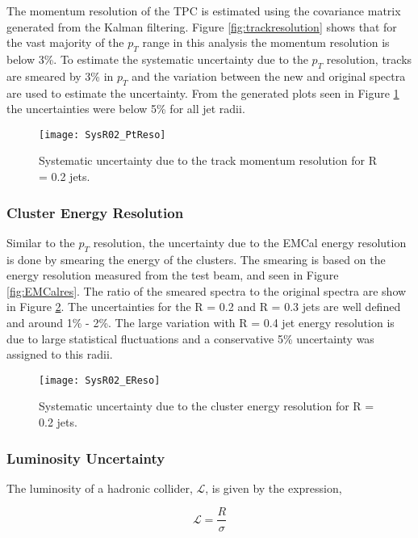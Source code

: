 The momentum resolution of the TPC is estimated using the covariance matrix generated from the Kalman filtering\cite{Fruhwirth:1987fm}.  Figure \ref{fig:trackresolution} shows that for the vast majority of the $p_{T}$ range in this analysis the  momentum resolution is below 3\%.  To estimate the systematic uncertainty due to the $p_{T}$ resolution, tracks are smeared by 3\% in $p_{T}$ and the variation between the new and original spectra are used to estimate the uncertainty.  From the generated plots seen in Figure \ref{fig:pTeff} the uncertainties were below 5\% for all jet radii.

\begin{figure}[b!]
\texttt{[image: SysR02\_PtReso]}
\centering
\caption{Systematic uncertainty due to the track momentum resolution for R = 0.2 jets.}
\label{fig:pTeff}
\end{figure}

\subsubsection{Cluster Energy Resolution}

Similar to the $p_{T}$ resolution, the uncertainty due to the EMCal energy resolution is done by smearing the energy of the clusters.  The smearing is based on the energy resolution measured from the test beam, and seen in Figure \ref{fig:EMCalres}.  The ratio of the smeared spectra to the original spectra are show in Figure \ref{fig:Eeff}. The uncertainties for the R = 0.2 and R = 0.3 jets are well defined and around 1\% - 2\%.  The large variation with R = 0.4 jet energy resolution is due to large statistical fluctuations and a conservative 5\% uncertainty was assigned to this radii.

\begin{figure}[t!]
\texttt{[image: SysR02\_EReso]}
\centering
\caption{Systematic uncertainty due to the cluster energy resolution for R = 0.2 jets.}
\label{fig:Eeff}
\end{figure}


\subsubsection{Luminosity Uncertainty}

The luminosity of a hadronic collider, $\mathscr{L}$, is given by the expression,



\begin{equation}
\mathscr{L} = \frac{R}{\sigma}
\label{eq:xlumdef}
\end{equation}

